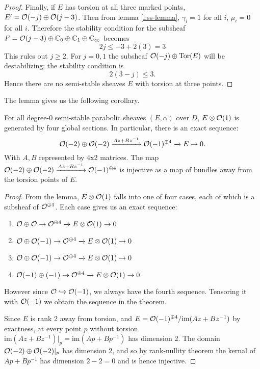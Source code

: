 \begin{proof}
		Finally, if $E$ has torsion at all three marked points, $E' = \mathcal{O}(-j)\oplus \mathcal{O}(j-3)$. Then from lemma \ref{l:ss-lemma}, $\gamma_i = 1$ for all $i$, $\mu_i = 0$ for all $i$.  Therefore the stability condition for the subsheaf $F=\mathcal{O}(j-3)\oplus\mathbb{C}_{0}\oplus \mathbb{C}_{1}\oplus \mathbb{C}_{\infty}$ becomes
		\begin{equation}
			2j \leq -3 + 2(3) = 3
		\end{equation}
		This rules out $j\geq 2$. For $j=0,1$ the subsheaf $\mathcal{O}(-j)\oplus\text{Tor}(E)$ will be destabilizing; the stability condition is
		\begin{equation}
			2(3-j) \leq 3.
		\end{equation}
		Hence there are no semi-stable sheaves $E$ with torsion at three points.
	\end{proof}
	The lemma gives us the following corollary.
	\begin{theorem}
		For all degree-0 semi-stable parabolic sheaves $(E,\alpha)$ over $D$, $E\otimes \mathcal{O}(1)$ is generated by four global sections. In particular, there is an exact sequence:
		\begin{equation}
		\mathcal{O}(-2)\oplus \mathcal{O}(-2) \xrightarrow{Az+Bz^{-1}} \mathcal{O}(-1)^{\oplus 4} \xrightarrow{} E \to 0.
		\end{equation}
		With $A,B$ represented by 4x2 matrices. The map $\mathcal{O}(-2)\oplus \mathcal{O}(-2) \xrightarrow{Az+Bz^{-1}} \mathcal{O}(-1)^{\oplus 4}$ is injective as a map of bundles away from the torsion points of $E$.
	\end{theorem}
	\begin{proof}
		From the lemma, $E\otimes \mathcal{O}(1)$ falls into one of four cases, each of which is a subsheaf of $\mathcal{O}^{\oplus 4}$. Each case gives us an exact sequence:
		\begin{enumerate}
			\item $\mathcal{O}\oplus \mathcal{O}\to \mathcal{O}^{\oplus 4}\xrightarrow{} E\otimes\mathcal{O}(1) \to 0$
			\item $\mathcal{O}\oplus\mathcal{O}(-1) \to \mathcal{O}^{\oplus 4}\xrightarrow{} E\otimes\mathcal{O}(1)  \to 0$
			\item $\mathcal{O}\oplus\mathcal{O}(-1) \to \mathcal{O}^{\oplus 4}\xrightarrow{} E\otimes\mathcal{O}(1) \to 0$
			\item $\mathcal{O}(-1)\oplus (-1)\to \mathcal{O}^{\oplus 4}\xrightarrow{} E\otimes\mathcal{O}(1) \to 0$
		\end{enumerate}
		However since $\mathcal{O} \hookrightarrow \mathcal{O}(-1)$, we always have the fourth sequence. Tensoring it with $\mathcal{O}(-1)$ we obtain the sequence in the theorem.
		
		Since $E$ is rank 2 away from torsion, and $E = \mathcal{O}(-1)^{\oplus 4}/\text{im}(Az+Bz^{-1})$ by exactness, at every point $p$ without torsion $\text{im}(Az+Bz^{-1})|_p = \text{im}(Ap+Bp^{-1})$ has dimension 2. The domain $\mathcal{O}(-2)\oplus\mathcal{O}(-2)|_p$ has dimension 2, and so by rank-nullity theorem the kernal of $Ap+Bp^{-1}$ has dimension $2-2=0$ and is hence injective. 
	\end{proof}
